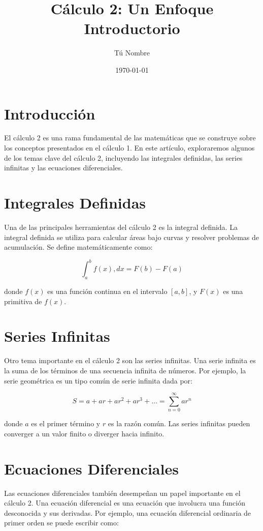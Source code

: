 \documentclass{article}
\title{Cálculo 2: Un Enfoque Introductorio}
\author{Tú Nombre}
\date{\today}
\begin{document}
\maketitle

\section{Introducción}
El cálculo 2 es una rama fundamental de las matemáticas que se construye sobre los conceptos presentados en el cálculo 1. En este artículo, exploraremos algunos de los temas clave del cálculo 2, incluyendo las integrales definidas, las series infinitas y las ecuaciones diferenciales.

\section{Integrales Definidas}
Una de las principales herramientas del cálculo 2 es la integral definida. La integral definida se utiliza para calcular áreas bajo curvas y resolver problemas de acumulación. Se define matemáticamente como:

\begin{equation}
\int_{a}^{b} f(x) , dx = F(b) - F(a)
\end{equation}

donde $f(x)$ es una función continua en el intervalo $[a, b]$, y $F(x)$ es una primitiva de $f(x)$.

\section{Series Infinitas}
Otro tema importante en el cálculo 2 son las series infinitas. Una serie infinita es la suma de los términos de una secuencia infinita de números. Por ejemplo, la serie geométrica es un tipo común de serie infinita dada por:

\begin{equation}
S = a + ar + ar^2 + ar^3 + \ldots = \sum_{n=0}^{\infty} ar^n
\end{equation}

donde $a$ es el primer término y $r$ es la razón común. Las series infinitas pueden converger a un valor finito o diverger hacia infinito.

\section{Ecuaciones Diferenciales}
Las ecuaciones diferenciales también desempeñan un papel importante en el cálculo 2. Una ecuación diferencial es una ecuación que involucra una función desconocida y sus derivadas. Por ejemplo, una ecuación diferencial ordinaria de primer orden se puede escribir como:
\end{document}
